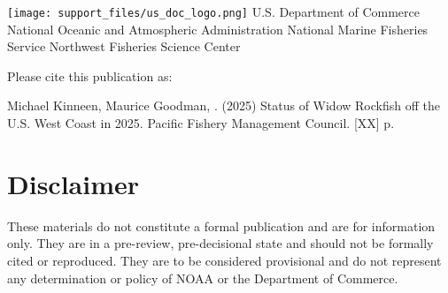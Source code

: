 \documentclass[
]{scrartcl}
\renewcommand*\contentsname{Table of contents}
\newcommand\contentsname{Table of contents}
\begin{document}
\begin{titlepage}
\begin{minipage}[b][\textheight][s]{\textwidth}

  \vfill


  \vspace{1\baselineskip}

  \texttt{[image: support\_files/us\_doc\_logo.png]}\newline %
  U.S. Department of Commerce\newline
  National Oceanic and Atmospheric Administration\newline
  National Marine Fisheries Service\newline
  Northwest Fisheries Science Center\newline

  \end{minipage}
  \restoregeometry
  \end{titlepage}

\renewcommand*\contentsname{Table of contents}
{
\hypersetup{linkcolor=}
\setcounter{tocdepth}{3}
\tableofcontents
}

\newpage{}

Please cite this publication as:

Michael Kinneen, Maurice Goodman, . (2025) Status of Widow Rockfish off
the U.S. West Coast in 2025. Pacific Fishery Management Council.
{[}XX{]} p.

\newpage{}

\setcounter{page}{1}

\renewcommand{\thetable}{\roman{table}}
\renewcommand{\thefigure}{\roman{figure}}

\section*{Disclaimer}\label{disclaimer}

These materials do not constitute a formal publication and are for
information only. They are in a pre-review, pre-decisional state and
should not be formally cited or reproduced. They are to be considered
provisional and do not represent any determination or policy of NOAA or
the Department of Commerce.
\end{document}
